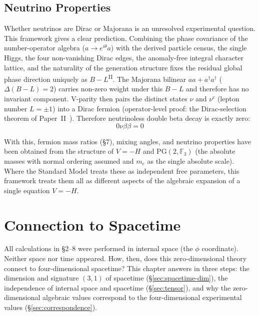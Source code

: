 \documentclass[12pt,a4paper]{article}
\newcommand{\PII}{\textsuperscript{\textup{II}}}
\begin{document}
\subsection{Neutrino Properties}

Whether neutrinos are Dirac or Majorana is an unresolved experimental question. This framework gives a clear prediction. Combining the phase covariance of the number-operator algebra ($a \to e^{i\theta}a$) with the derived particle census, the single Higgs, the four non-vanishing Dirac edges, the anomaly-free integral character lattice, and the naturality of the generation structure fixes the residual global phase direction uniquely as $B-L$\PII{}. The Majorana bilinear $aa + a^\dagger a^\dagger$ ($\Delta(B{-}L) = 2$) carries non-zero weight under this $B-L$ and therefore has no invariant component.
V-parity then pairs the distinct states $\nu$ and $\nu^c$
(lepton number $L = \pm 1$) into a Dirac fermion (operator-level proof: the Dirac-selection theorem of Paper~II~\cite{paper2}).
Therefore neutrinoless double beta decay is exactly zero:
\begin{equation}
  0\nu\beta\beta = 0
\end{equation}



With this, fermion mass ratios (\S7), mixing angles, and neutrino properties have been obtained from the structure of $V = -H$ and $\mathrm{PG}(2, \mathbb{F}_3)$ (the absolute masses with normal ordering assumed and $m_e$ as the single absolute scale). Where the Standard Model treats these as independent free parameters, this framework treats them all as different aspects of the algebraic expansion of a single equation $V = -H$.



\section{Connection to Spacetime}\label{sec:4d}

All calculations in \S2--8 were performed in internal space
(the $\phi$ coordinate).
Neither space nor time appeared.
How, then, does this zero-dimensional theory connect to
four-dimensional spacetime?
This chapter answers in three steps: the dimension and signature $(3,1)$ of spacetime
(\S\ref{sec:spacetime-dim}), the independence of internal space
and spacetime (\S\ref{sec:tensor}), and why the zero-dimensional
algebraic values correspond to the four-dimensional experimental
values (\S\ref{sec:correspondence}).
\end{document}
